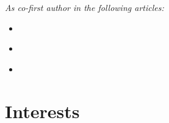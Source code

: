 \documentclass[11pt,a4paper,sans]{moderncv}
\begin{document}
\par{\vspace{1em}
\textit{As co-first author in the following articles:}
\begin{itemize}
  \item \cite{ndiaye_expression_2017}
  \item \cite{verbanck_low-dose_2017}
  \item \cite{abderrahmani_increased_2018}
\end{itemize}
}


\section{Interests}
\end{document}
